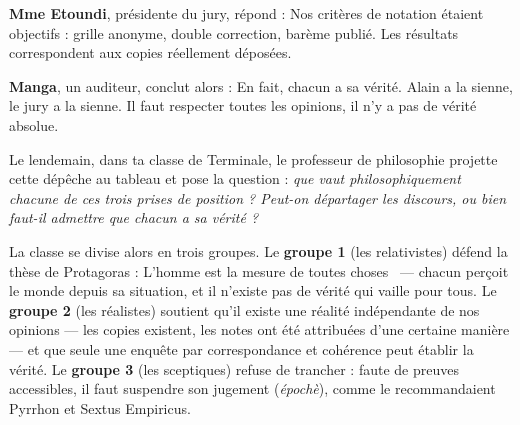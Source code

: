 \documentclass[11pt]{article}
\newcounter{popsec}
\newcounter{popsub}
\newcommand{\courssub}[1]{%
  \stepcounter{popsub}%
  \par\vspace{9pt}\noindent{\popxbold\fontsize{11.5}{13}\selectfont\color{popink}{\color{poporange}\thepopsec.\thepopsub}\hspace{6pt}#1}\par\nopagebreak\vspace{4pt}
}
\begin{document}
\textbf{Mme Etoundi}, présidente du jury, répond : \guillemotleft Nos critères de notation étaient objectifs : grille anonyme, double correction, barème publié. Les résultats correspondent aux copies réellement déposées. \guillemotright

\textbf{Manga}, un auditeur, conclut alors : \guillemotleft En fait, chacun a sa vérité. Alain a la sienne, le jury a la sienne. Il faut respecter toutes les opinions, il n'y a pas de vérité absolue. \guillemotright

Le lendemain, dans ta classe de Terminale, le professeur de philosophie projette cette dépêche au tableau et pose la question : \emph{que vaut philosophiquement chacune de ces trois prises de position ? Peut-on départager les discours, ou bien faut-il admettre que \guillemotleft chacun a sa vérité \guillemotright ?}

La classe se divise alors en trois groupes. Le \textbf{groupe 1} (les relativistes) défend la thèse de Protagoras : \guillemotleft L'homme est la mesure de toutes choses \guillemotright\ — chacun perçoit le monde depuis sa situation, et il n'existe pas de vérité qui vaille pour tous. Le \textbf{groupe 2} (les réalistes) soutient qu'il existe une réalité indépendante de nos opinions — les copies existent, les notes ont été attribuées d'une certaine manière — et que seule une enquête par correspondance et cohérence peut établir la vérité. Le \textbf{groupe 3} (les sceptiques) refuse de trancher : faute de preuves accessibles, il faut suspendre son jugement (\emph{épochè}), comme le recommandaient Pyrrhon et Sextus Empiricus.

\courssub{Consignes}
\end{document}
